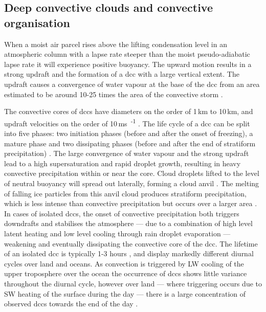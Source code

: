 \subsection{Deep convective clouds and convective organisation}


When a moist air parcel rises above the lifting condensation level in an atmospheric column with a lapse rate steeper than the moist pseudo-adiabatic lapse rate it will experience positive buoyancy.
The upward motion results in a strong updraft and the formation of a \acrshort{dcc} with a large vertical extent.
The updraft causes a convergence of water vapour at the base of the \acrshort{dcc} from an area estimated to be around 10-25 times the area of the convective storm \citep{trenberth_changing_2003}.

The convective cores of \acrshort{dcc}s have diameters on the order of 1\,\unit{km} to 10\,\unit{km}, and updraft velocities on the order of 10\,\unit{ms\textsuperscript{-1}} \citep{weisman_mesoscale_2015}.
The life cycle of a \acrshort{dcc} can be split into five phases: two initiation phases (before and after the onset of freezing), a mature phase and two dissipating phases (before and after the end of stratiform precipitation) \citep{wall_life_2018}.
The large convergence of water vapour and the strong updraft lead to a high supersaturation and rapid droplet growth, resulting in heavy convective precipitation within or near the core.
Cloud droplets lifted to the level of neutral buoyancy will spread out laterally, forming a cloud anvil \citep{houze_chapter_2014}. 
The melting of falling ice particles from this anvil cloud produces stratiform precipitation, which is less intense than convective precipitation but occurs over a larger area \citep{houze_stratiform_1997}.
In cases of isolated \acrshort{dcc}s, the onset of convective precipitation both triggers downdrafts and stabilises the atmosphere --- due to a combination of high level latent heating and low level cooling through rain droplet evaporation --- weakening and eventually dissipating the convective core of the \acrshort{dcc}.
The lifetime of an isolated \acrshort{dcc} is typically 1-3 hours \citep{chen_diurnal_1997}, and display markedly different diurnal cycles over land and oceans. 
As convection is triggered by LW cooling of the upper troposphere over the ocean the occurrence of \acrshort{dcc}s shows little variance throughout the diurnal cycle, however over land --- where triggering occurs due to SW heating of the surface during the day --- there is a large concentration of observed \acrshort{dcc}s towards the end of the day \citep{taylor_evaluating_2017}.

